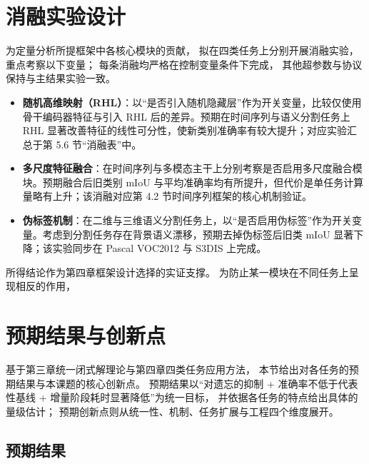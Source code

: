\section{消融实验设计}

为定量分析所提框架中各核心模块的贡献，
拟在四类任务上分别开展消融实验，
重点考察以下变量；
每条消融均严格在控制变量条件下完成，
其他超参数与协议保持与主结果实验一致。

\begin{itemize}
    \item \textbf{随机高维映射（RHL）}：以“是否引入随机隐藏层”作为开关变量，比较仅使用骨干编码器特征与引入 RHL 后的差异。预期在时间序列与语义分割任务上 RHL 显著改善特征的线性可分性，使新类别准确率有较大提升；对应实验汇总于第 5.6 节“消融表”中。
    \item \textbf{多尺度特征融合}：在时间序列与多模态主干上分别考察是否启用多尺度融合模块。预期融合后旧类别 mIoU 与平均准确率均有所提升，但代价是单任务计算量略有上升；该消融对应第 4.2 节时间序列框架的核心机制验证。
    \item \textbf{伪标签机制}：在二维与三维语义分割任务上，以“是否启用伪标签”作为开关变量。考虑到分割任务存在背景语义漂移，预期去掉伪标签后旧类 mIoU 显著下降；该实验同步在 Pascal VOC2012 与 S3DIS 上完成。
\end{itemize}


所得结论作为第四章框架设计选择的实证支撑。
为防止某一模块在不同任务上呈现相反的作用，


\section{预期结果与创新点}

基于第三章统一闭式解理论与第四章四类任务应用方法，
本节给出对各任务的预期结果与本课题的核心创新点。
预期结果以“对遗忘的抑制 + 准确率不低于代表性基线 + 增量阶段耗时显著降低”为统一目标，
并依据各任务的特点给出具体的量级估计；
预期创新点则从统一性、机制、任务扩展与工程四个维度展开。

\subsection{预期结果}

